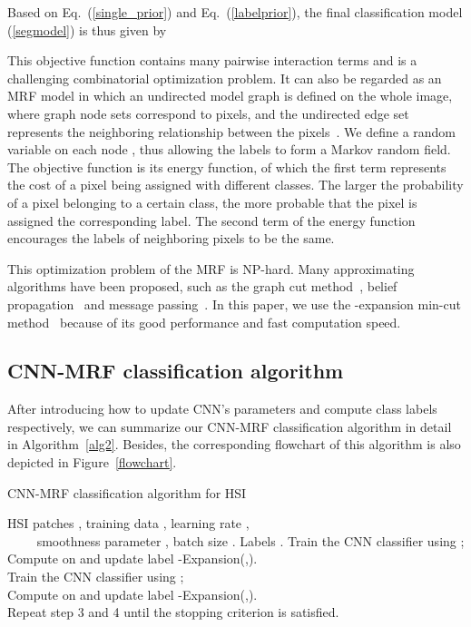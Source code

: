 \documentclass[journal]{IEEEtran}
\begin{document}
	Based on Eq.\ (\ref{single_prior}) and Eq.\ (\ref{labelprior}), the final {{classification}} model (\ref{segmodel}) is thus given by 
	
	This objective function contains many pairwise interaction terms and is a challenging combinatorial optimization problem. It can also be regarded as an MRF model in which an undirected model graph  is defined on the whole image, where graph node sets  correspond to pixels, and the undirected edge set  represents the neighboring relationship between the pixels~\cite{boykov2001interactive}. We define a random variable  on each node , thus allowing the labels  to form a Markov random field. The objective function is its energy function, of which the first term represents the cost of a pixel being assigned with different classes. The larger the probability of a pixel belonging to a certain class, the more probable that the pixel is assigned the corresponding label. The second term of the energy function encourages the labels of neighboring pixels to be the same. 
	
	This optimization problem of the MRF is NP-hard. Many approximating algorithms have been proposed, such as the graph cut method~\cite{boykov2001fast,kolmogorov2004energy}, belief propagation~\cite{yedidia2005constructing} and message passing~\cite{kolmogorov2006convergent}. In this paper, we use the -expansion min-cut method~\cite{boykov2001fast} because of its good performance and fast computation speed. 
	
	{{
			\subsection{CNN-MRF classification algorithm}
			After introducing how to update CNN's parameters and compute class labels respectively, we can summarize our CNN-MRF classification algorithm in detail in Algorithm~\ref{alg2}. Besides, the corresponding flowchart of this algorithm is also depicted in Figure~\ref{flowchart}. 
		}}
		\begin{algorithm}[H]
			\caption{{{CNN-MRF classification algorithm for HSI}}} \label{alg2}
			\begin{algorithmic}[1]
				\REQUIRE HSI patches , training data , learning rate ,\\ ~~~~ smoothness parameter , batch size .
				\ENSURE Labels .
				{{
						\STATE Train the CNN classifier using ;\\
						\STATE Compute  on  and update label -Expansion(,).\\
						\STATE Train the CNN classifier using ; \\
						\STATE Compute  on  and update label -Expansion(,).\\
						\STATE Repeat step 3 and 4 until the stopping criterion is satisfied.}} 
			\end{algorithmic}
		\end{algorithm}
		
\end{document}
